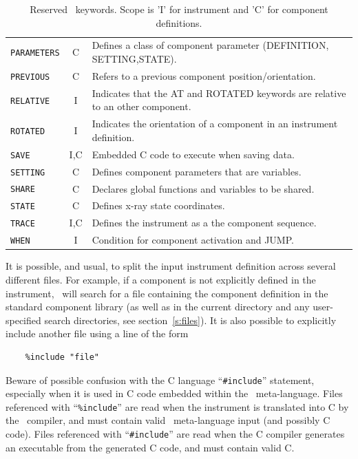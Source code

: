 \begin{table}
\begin{center}
{\begin{tabular}{|l|c|p{}|}
      \texttt{PARAMETERS} & C & Defines a class of component parameter (DEFINITION, SETTING,STATE). \\
      \texttt{PREVIOUS} & C & Refers to a previous component position/orientation.\\
      \texttt{RELATIVE} & I & Indicates that the AT and ROTATED keywords are relative to an other component. \\
      \texttt{ROTATED} & I & Indicates the orientation of a component in an instrument definition. \\
      \texttt{SAVE} & I,C & Embedded C code to execute when saving data. \\
      \texttt{SETTING} & C & Defines component parameters that are
      variables. \\
      \texttt{SHARE} & C & Declares global functions and variables to be shared. \\
      \texttt{STATE} & C & Defines x-ray state coordinates. \\
      \texttt{TRACE} & I,C & Defines the instrument as a the component sequence. \\
      \texttt{WHEN}  & I & Condition for component activation and JUMP.\\
      \hline
    \end{tabular}
    \caption{Reserved \MCX\ keywords.
    Scope is 'I' for instrument and 'C' for component definitions.}
    \label{t:keywords}
    }
  \end{center}
\end{table}

It is possible, and usual, to split the input instrument definition
across several different files. For example, if a component is not
explicitly defined in the instrument,
\MCX\ will search for a file containing the component definition in the
standard component library (as well as in the current directory and any
user-specified search directories, see section~\ref{s:files}). It is
also possible to explicitly include another file using a line of the
form 
\begin{verbatim}
    %include "file"
\end{verbatim}
Beware of possible confusion with the C language ``\verb+#include+''
statement, especially when it is used in C code embedded within the
\MCX\ meta-language. Files referenced with ``\verb+%include+'' are read
when the instrument is translated into C by the \MCX\ compiler, and must
contain valid \MCX\ meta-language input (and possibly C code). Files referenced with
``\verb+#include+'' are read when the C compiler generates an
executable from the generated C code, and must contain valid C.

